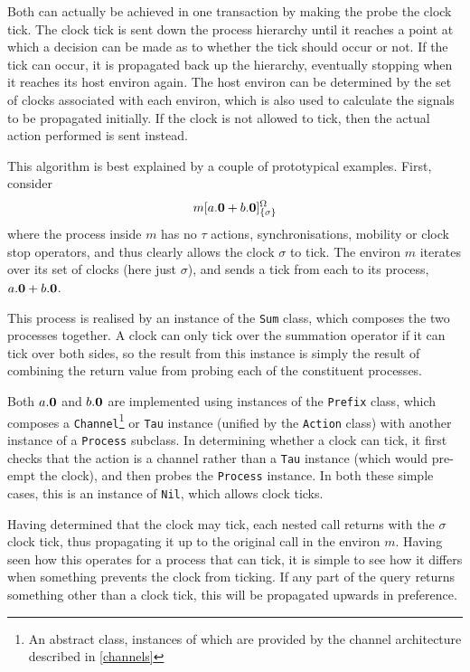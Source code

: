 Both can actually be achieved in one transaction by making the probe the
clock tick.  The clock tick is sent down the process hierarchy until it
reaches a point at which a decision can be made as to whether the tick
should occur or not.  If the tick can occur, it is propagated back up
the hierarchy, eventually stopping when it reaches its host environ
again.  The host environ can be determined by the set of clocks
associated with each environ, which is also used to calculate the
signals to be propagated initially.  If the clock is not allowed to
tick, then the actual action performed is sent instead.

This algorithm is best explained by a couple of prototypical examples.
First, consider 
\begin{displaymath}
{m}[ a.\textbf{0} + b.\textbf{0} ]^{\Omega}_{\{\sigma\}}
\end{displaymath}
where the process inside $m$ has no $\tau$ actions, synchronisations,
mobility or clock stop operators, and thus clearly allows the clock
$\sigma$ to tick.  The environ $m$ iterates over its set of clocks (here
just $\sigma$), and sends a tick from each to its process, $a.\textbf{0} +
b.\textbf{0}$.

This process is realised by an instance of the \texttt{Sum} class, which
composes the two processes together.  A clock can only tick over the
summation operator if it can tick over both sides, so the result from
this instance is simply the result of combining the return value from
probing each of the constituent processes.

Both $a.\textbf{0}$ and $b.\textbf{0}$ are implemented using instances of the
\texttt{Prefix} class, which composes a \texttt{Channel}\footnote{An
abstract class, instances of which are provided by the channel
architecture described in \ref{channels}} or \texttt{Tau} instance
(unified by the \texttt{Action} class) with another instance of a
\texttt{Process} subclass.  In determining whether a clock can tick, it
first checks that the action is a channel rather than a \texttt{Tau}
instance (which would pre-empt the clock), and then probes the
\texttt{Process} instance.  In both these simple cases, this is an
instance of \texttt{Nil}, which allows clock ticks.

Having determined that the clock may tick, each nested call returns with
the $\sigma$ clock tick, thus propagating it up to the original call in
the environ $m$.  Having seen how this operates for a process that can
tick, it is simple to see how it differs when something prevents the
clock from ticking.  If any part of the query returns something other
than a clock tick, this will be propagated upwards in preference.

